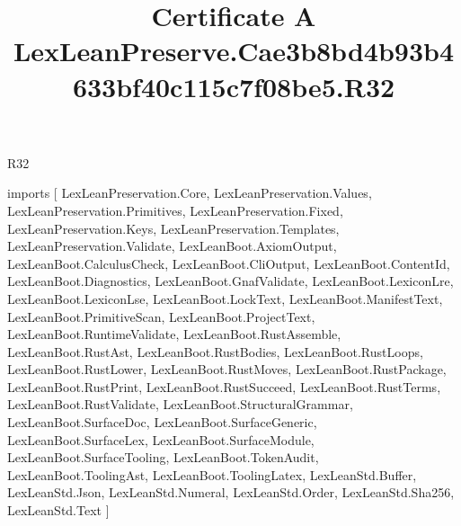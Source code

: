 \begin{lexlean}{R32}
\title{Certificate A LexLeanPreserve.Cae3b8bd4b93b4633bf40c115c7f08be5.R32}
\begin{coremodule}
imports [
  LexLeanPreservation.Core,
  LexLeanPreservation.Values,
  LexLeanPreservation.Primitives,
  LexLeanPreservation.Fixed,
  LexLeanPreservation.Keys,
  LexLeanPreservation.Templates,
  LexLeanPreservation.Validate,
  LexLeanBoot.AxiomOutput,
  LexLeanBoot.CalculusCheck,
  LexLeanBoot.CliOutput,
  LexLeanBoot.ContentId,
  LexLeanBoot.Diagnostics,
  LexLeanBoot.GnafValidate,
  LexLeanBoot.LexiconLre,
  LexLeanBoot.LexiconLse,
  LexLeanBoot.LockText,
  LexLeanBoot.ManifestText,
  LexLeanBoot.PrimitiveScan,
  LexLeanBoot.ProjectText,
  LexLeanBoot.RuntimeValidate,
  LexLeanBoot.RustAssemble,
  LexLeanBoot.RustAst,
  LexLeanBoot.RustBodies,
  LexLeanBoot.RustLoops,
  LexLeanBoot.RustLower,
  LexLeanBoot.RustMoves,
  LexLeanBoot.RustPackage,
  LexLeanBoot.RustPrint,
  LexLeanBoot.RustSucceed,
  LexLeanBoot.RustTerms,
  LexLeanBoot.RustValidate,
  LexLeanBoot.StructuralGrammar,
  LexLeanBoot.SurfaceDoc,
  LexLeanBoot.SurfaceGeneric,
  LexLeanBoot.SurfaceLex,
  LexLeanBoot.SurfaceModule,
  LexLeanBoot.SurfaceTooling,
  LexLeanBoot.TokenAudit,
  LexLeanBoot.ToolingAst,
  LexLeanBoot.ToolingLatex,
  LexLeanStd.Buffer,
  LexLeanStd.Json,
  LexLeanStd.Numeral,
  LexLeanStd.Order,
  LexLeanStd.Sha256,
  LexLeanStd.Text
]


\end{coremodule}
\end{lexlean}
